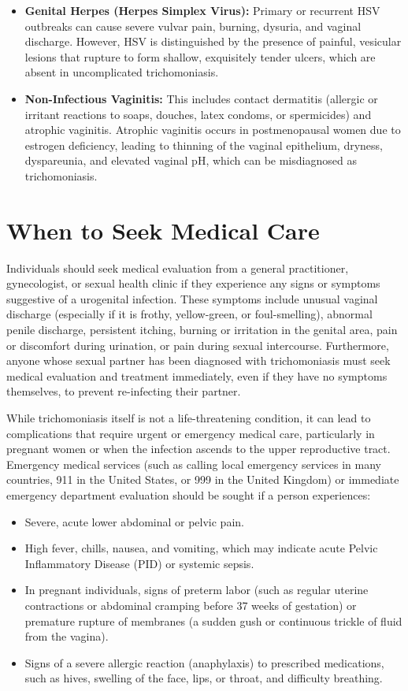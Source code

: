 \begin{itemize}
    \item \textbf{Genital Herpes (Herpes Simplex Virus):} Primary or recurrent HSV outbreaks can cause severe vulvar pain, burning, dysuria, and vaginal discharge. However, HSV is distinguished by the presence of painful, vesicular lesions that rupture to form shallow, exquisitely tender ulcers, which are absent in uncomplicated trichomoniasis.
    \item \textbf{Non-Infectious Vaginitis:} This includes contact dermatitis (allergic or irritant reactions to soaps, douches, latex condoms, or spermicides) and atrophic vaginitis. Atrophic vaginitis occurs in postmenopausal women due to estrogen deficiency, leading to thinning of the vaginal epithelium, dryness, dyspareunia, and elevated vaginal pH, which can be misdiagnosed as trichomoniasis.
\end{itemize}

\section*{When to Seek Medical Care}
Individuals should seek medical evaluation from a general practitioner, gynecologist, or sexual health clinic if they experience any signs or symptoms suggestive of a urogenital infection. These symptoms include unusual vaginal discharge (especially if it is frothy, yellow-green, or foul-smelling), abnormal penile discharge, persistent itching, burning or irritation in the genital area, pain or discomfort during urination, or pain during sexual intercourse. Furthermore, anyone whose sexual partner has been diagnosed with trichomoniasis must seek medical evaluation and treatment immediately, even if they have no symptoms themselves, to prevent re-infecting their partner.

While trichomoniasis itself is not a life-threatening condition, it can lead to complications that require urgent or emergency medical care, particularly in pregnant women or when the infection ascends to the upper reproductive tract. Emergency medical services (such as calling local emergency services in many countries, 911 in the United States, or 999 in the United Kingdom) or immediate emergency department evaluation should be sought if a person experiences:
\begin{itemize}
    \item Severe, acute lower abdominal or pelvic pain.
    \item High fever, chills, nausea, and vomiting, which may indicate acute Pelvic Inflammatory Disease (PID) or systemic sepsis.
    \item In pregnant individuals, signs of preterm labor (such as regular uterine contractions or abdominal cramping before 37 weeks of gestation) or premature rupture of membranes (a sudden gush or continuous trickle of fluid from the vagina).
    \item Signs of a severe allergic reaction (anaphylaxis) to prescribed medications, such as hives, swelling of the face, lips, or throat, and difficulty breathing.
\end{itemize}


